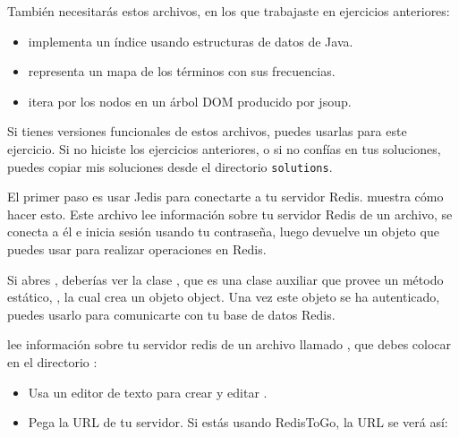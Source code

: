 \documentclass[12pt]{book}
\theoremstyle{exercise}
\begin{document}
También necesitarás estos archivos, en los que trabajaste en ejercicios
anteriores:

\begin{itemize}

\item
   implementa un índice usando estructuras de datos de Java.

\item
   representa un mapa de los términos con sus
  frecuencias.

\item
   itera por los nodos en un árbol DOM
  producido por jsoup.

\end{itemize}

Si tienes versiones funcionales de estos archivos, puedes usarlas para
este ejercicio.  Si no hiciste los ejercicios anteriores, o si
no confías en tus soluciones, puedes copiar mis soluciones desde el
directorio {\tt solutions}.

El primer paso es usar Jedis para conectarte a tu servidor Redis.
 muestra cómo hacer esto. Este archivo lee información
sobre tu servidor Redis de un archivo, se conecta a él e inicia sesión
usando tu contraseña, luego devuelve un objeto  que puedes usar
para realizar operaciones en Redis.


Si abres , deberías ver la clase
, que es una clase auxiliar que provee un método
estático, , la cual crea un objeto  object. Una
vez este objeto se ha autenticado, puedes usarlo para comunicarte con tu
base de datos Redis.

 lee información sobre tu servidor redis de un archivo
llamado , que debes colocar en el directorio
:

\begin{itemize}

\item
  Usa un editor de texto para crear y editar
  .

\item
  Pega la URL de tu servidor. Si estás usando RedisToGo, la URL
  se verá así:


\end{itemize}
\end{document}
